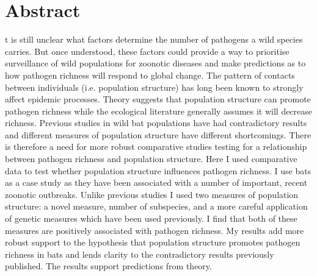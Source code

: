 





\section{Abstract}


t is still unclear what factors determine the number of pathogens a wild species carries.
But once understood, these factors could provide a way to prioritise surveillance of wild populations for zoonotic diseases and make predictions as to how pathogen richness will respond to global change.
The pattern of contacts between individuals (i.e. population structure) has long been known to strongly affect epidemic processes.
Theory suggests that population structure can promote pathogen richness while the ecological literature generally assumes it will decrease richness.
Previous studies in wild bat populations have had contradictory results and different measures of population structure have different shortcomings.
There is therefore a need for more robust comparative studies testing for a relationship between pathogen richness and population structure.
Here I used comparative data to test whether population structure influences pathogen richness.
I use bats as a case study as they have been associated with a number of important, recent zoonotic outbreaks.
Unlike previous studies I used two measures of population structure: a novel measure, number of subspecies, and a more careful application of genetic measures which have been used previously.
I find that both of these measures are positively associated with pathogen richness.
My results add more robust support to the hypothesis that population structure promotes pathogen richness in bats and lends clarity to the contradictory results previously published.
The results support predictions from theory.
